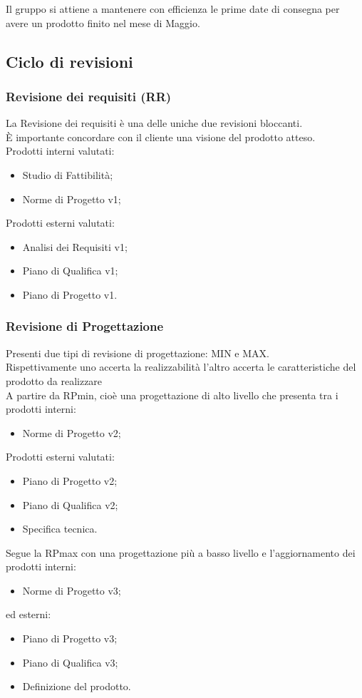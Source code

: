 \documentclass[12pt,a4paper,titlepage]{article}
\begin{document}
	Il gruppo si attiene a mantenere con efficienza le prime date di consegna per avere un prodotto finito nel mese di Maggio.
	
	\normalsize
	\subsection{Ciclo di revisioni}
	\subsubsection{Revisione dei requisiti (RR)}
	La Revisione dei requisiti è una delle uniche due revisioni bloccanti.\\
	È importante concordare con il cliente una visione del prodotto atteso.\\
	Prodotti interni valutati:
	\begin{itemize}
		\item Studio di Fattibilità;
		\item Norme di Progetto v1;
	\end{itemize}
	Prodotti esterni valutati:
	\begin{itemize}
		\item Analisi dei Requisiti v1;
		\item Piano di Qualifica v1;
		\item Piano di Progetto v1.
	\end{itemize}
	
	\subsubsection{Revisione di Progettazione}
	Presenti due tipi di revisione di progettazione: MIN e MAX. \\
	Rispettivamente uno accerta la realizzabilità l'altro accerta le caratteristiche del prodotto da realizzare\\
	A partire da RPmin, cioè una progettazione di alto livello che presenta tra i prodotti interni:
	\begin{itemize}
		\item Norme di Progetto v2;
	\end{itemize}
	Prodotti esterni valutati: 
	\begin{itemize}
		\item Piano di Progetto v2;
		\item Piano di Qualifica v2;
		\item Specifica tecnica.
	\end{itemize}
	Segue la RPmax con una progettazione più a basso livello e l'aggiornamento dei prodotti interni:
	\begin{itemize}
		\item Norme di Progetto v3;
	\end{itemize}
	ed esterni:
	\begin{itemize}
		\item Piano di Progetto v3;
		\item Piano di Qualifica v3;
		\item Definizione del prodotto.
	\end{itemize}
	
\end{document}
